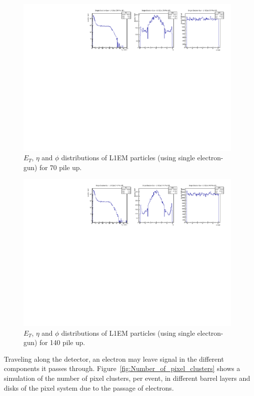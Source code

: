 \begin{figure}[!htb]
  \centering
  \includegraphics[scale=0.8]{../SimulationTools/L1EM_EtEtaPhi_70PileUP.pdf}
  \caption{$E_{T}$, $\eta$ and $\phi$ distributions of L1EM particles (using single electron-gun) for 70 pile up.}
  \label{fig:L1EM_EtEtaPhi_70PileUP}
\end{figure}

\begin{figure}[!htb]
  \centering
  \includegraphics[scale=0.8]{../SimulationTools/L1EM_EtEtaPhi_140PileUP.pdf}
  \caption{$E_{T}$, $\eta$ and $\phi$ distributions of L1EM particles (using single electron-gun) for 140 pile up.}
  \label{fig:L1EM_EtEtaPhi_140PileUP}
\end{figure}

Traveling along the detector, an electron may leave signal in the different components it passes through.
Figure~\ref{fig:Number_of_pixel_clusters} shows a simulation of the number of pixel clusters, per event, in different
barrel layers and disks of the pixel system due to the passage of electrons.

